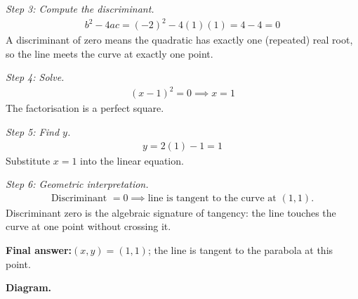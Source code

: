 \documentclass[11pt]{article}
\begin{document}
\textit{Step 3: Compute the discriminant.}
\[\begin{gathered}
b^2 - 4ac = (-2)^2 - 4(1)(1) = 4 - 4 = 0
\end{gathered}\]
A discriminant of zero means the quadratic has exactly one (repeated) real root, so the line meets the curve at exactly one point.

\textit{Step 4: Solve.}
\[\begin{gathered}
(x - 1)^2 = 0 \implies x = 1
\end{gathered}\]
The factorisation is a perfect square.

\textit{Step 5: Find \( y \).}
\[\begin{gathered}
y = 2(1) - 1 = 1
\end{gathered}\]
Substitute \( x = 1 \) into the linear equation.

\textit{Step 6: Geometric interpretation.}
\[\begin{gathered}
\text{Discriminant } = 0 \implies \text{line is tangent to the curve at } (1, 1).
\end{gathered}\]
Discriminant zero is the algebraic signature of tangency: the line touches the curve at one point without crossing it.

\begin{answerbox}
\textbf{Final answer:}\quad \(\displaystyle (x, y) = (1, 1)\); the line is tangent to the parabola at this point.
\end{answerbox}
\textbf{Diagram.}
\end{document}
